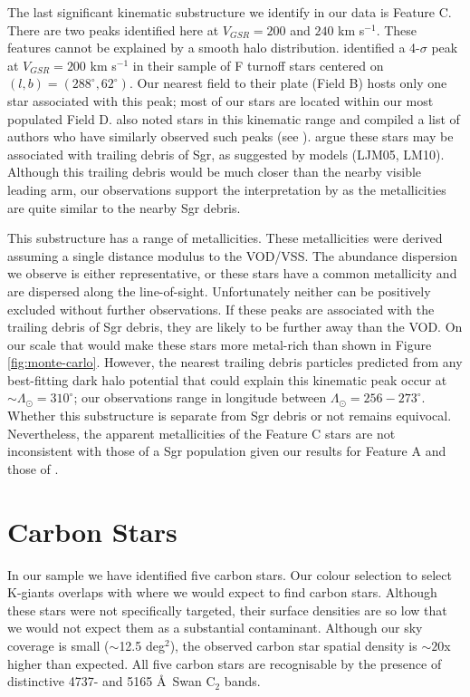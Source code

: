 \documentclass[preprint2]{aastex}
\begin{document}
	The last significant kinematic substructure we identify in our data is Feature C. There are two peaks identified here at $V_{GSR} = 200$ and $240$ km s$^{-1}$. These features cannot be explained by a smooth halo distribution. \citet{Newberg;et-al_2007} identified a 4-$\sigma$ peak at $V_{GSR} = 200$ km s$^{-1}$ in their sample of F turnoff stars centered on $(l, b) = (288^\circ, 62^\circ)$. Our nearest field to their plate (Field B) hosts only one star associated with this peak; most of our stars are located within our most populated Field D. \citet{Prior;et-al_2009b} also noted stars in this kinematic range and compiled a list of authors who have similarly observed such peaks (see \citet{Sirko;et-al_2004, Duffau;et-al_2006, Starkenburg;et-al_2009}). \citet{Prior;et-al_2009b} argue these stars may be associated with trailing debris of Sgr, as suggested by models (LJM05, LM10).  Although this trailing debris would be much closer than the nearby visible leading arm, our observations support the interpretation by \citet{Prior;et-al_2009b} as the metallicities are quite similar to the nearby Sgr debris.
	
	This substructure has a range of metallicities. These metallicities were derived assuming a single distance modulus to the VOD/VSS. The abundance dispersion we observe is either representative, or these stars have a common metallicity and are dispersed along the line-of-sight. Unfortunately neither can be positively excluded without further observations. If these peaks are associated with the trailing debris of Sgr debris, they are likely to be further away than the VOD. On our scale that would make these stars more metal-rich than shown in Figure \ref{fig:monte-carlo}. However, the nearest trailing debris particles predicted from any best-fitting dark halo potential that could explain this kinematic peak occur at $\sim\Lambda_\odot = 310^\circ$; our observations range in longitude  between $\Lambda_\odot = 256-273^\circ$. Whether this substructure is separate from Sgr debris or not remains equivocal. Nevertheless, the apparent metallicities of the Feature C stars are not inconsistent with those of a Sgr population given our results for Feature A and those of \citet{Keller;Yong;Da_Costa_2010}.
	
\section{Carbon Stars}
\label{sec:carbon-stars}	

	In our sample we have identified five carbon stars. Our colour selection to select K-giants overlaps with where we would expect to find carbon stars. Although these stars were not specifically targeted, their surface densities are so low \citep[$\approx$ 1 per 50 deg$^2$;][]{Green;et-al_1994} that we would not expect them as a substantial contaminant.  Although our sky coverage is small ($\sim$12.5 deg$^2$), the observed carbon star spatial density is $\sim20$x higher than expected. All five carbon stars are recognisable by the presence of distinctive 4737- and 5165 \AA\, Swan C$_2$ bands.
\end{document}
